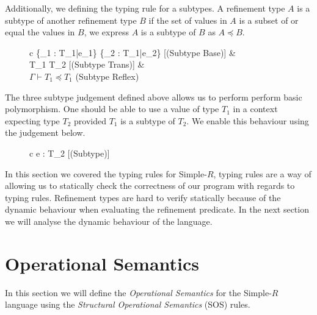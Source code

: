 \documentclass[a4paper,12pt]{report}
\begin{document}
Additionally, we defining the typing rule for a subtypes. A refinement type 
$A$ is a subtype of another refinement type $B$ if 
the set of values in $A$ is a subset of or equal the values in $B$, 
we express $A$ is a subtype of $B$ as $A \preceq B$. 

\begin{figure}[H]
  \begin{center}
    \begin{tabular} {c}
      {\Gamma \vdash \{\upsilon_1 : T_1\text{ }|\text{ }e_1\} \preceq \{\upsilon_2 : T_1\text{ }|\text{ }e_2\}} [(Subtype Base)]
      & \\ 
      {\Gamma \vdash T_1 \preceq T_2} [(Subtype Trans)]
      & \\
      $\Gamma \vdash T_1 \preceq T_1$ (Subtype Reflex)
    \end{tabular}
  \end{center}
\end{figure}

\par
The three subtype judgement defined above allows us to perform perform basic 
polymorphism. One should be able to use a value of type $T_1$ in a context 
expecting type $T_2$ provided $T_1$ is a subtype of $T_2$. We enable this 
behaviour using the judgement below.

\begin{figure}[H]
  \begin{center}
    \begin{tabular} {c}
      {\Gamma \vdash e : T_2} [(Subtype)]
    \end{tabular}
  \end{center}
\end{figure}

\par
In this section we covered the typing rules for Simple-$R$, typing rules are a 
way of allowing us to statically check the correctness of our program with 
regards to typing rules. Refinement types are hard to verify statically because 
of the dynamic behaviour when evaluating the refinement predicate. In the next 
section we will analyse the dynamic behaviour of the language. 

\section{Operational Semantics}
In this section we will define the \textit{Operational Semantics} 
\cite{operationalSemantics} for the Simple-$R$ language 
using the \textit{Structural Operational Semantics} \cite{plotkinSOS} (SOS) rules.
\end{document}
